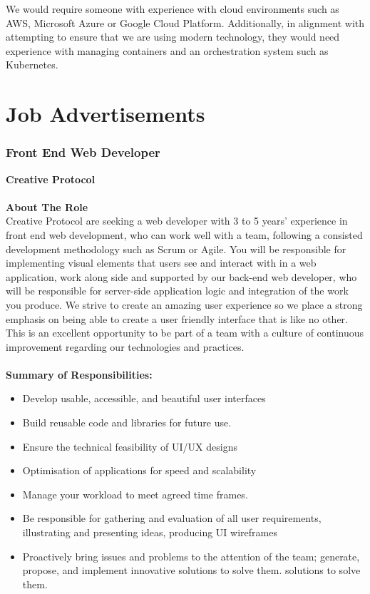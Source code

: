 \documentclass[11pt, oneside, a4paper, titlepage]{article}
\begin{document}
We would require someone with experience with cloud environments such as AWS, Microsoft Azure or Google Cloud Platform.  Additionally, in alignment with attempting to ensure that we are using modern technology, they would need experience with managing containers and an orchestration system such as Kubernetes. 
\newpage

\section{Job Advertisements}
\subsubsection{Front End Web Developer}
\textbf{Creative Protocol }
\\
\\
\textbf{About The Role}
\\
Creative Protocol are seeking a web developer with 3 to 5 years' experience in front end web development, who can work well with a team, following a consisted development methodology such as Scrum or Agile. You will be  responsible for implementing visual elements that users see and interact with in a web application, work along side and supported by our back-end web developer, who will be responsible for server-side application logic and integration of the work you produce. We strive to create an amazing user experience so we place a strong emphasis on being able to create a user friendly interface that is like no other. This is an excellent opportunity to be part of a team with a culture of continuous improvement regarding our technologies and practices. 
\\
\\
\textbf{Summary of Responsibilities:}
\begin{itemize}
    	\item Develop usable, accessible, and beautiful user interfaces 
    	\item Build reusable code and libraries for future use. 
    	\item Ensure the technical feasibility of UI/UX designs 
    	\item Optimisation of applications for speed and scalability 
    	\item Manage your workload to meet agreed time frames. 
    	\item Be responsible for gathering and evaluation of all user requirements, illustrating and presenting ideas, producing UI wireframes 
    	\item Proactively bring issues and problems to the attention of the team; generate, propose, and implement innovative solutions to solve them.  solutions to solve them. 
\end{itemize}
\end{document}
